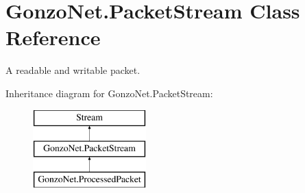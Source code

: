 \hypertarget{class_gonzo_net_1_1_packet_stream}{\section{Gonzo\+Net.\+Packet\+Stream Class Reference}
\label{class_gonzo_net_1_1_packet_stream}
}


A readable and writable packet.  


Inheritance diagram for Gonzo\+Net.\+Packet\+Stream\+:\begin{figure}[H]
\begin{center}
\leavevmode
\includegraphics[height=3.000000cm]{class_gonzo_net_1_1_packet_stream}
\end{center}
\end{figure}
